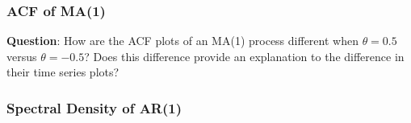 \documentclass[%
xcolor=pdftex]{beamer}
\begin{document}
\begin{frame}
\frametitle{ACF of MA(1)}

\textbf{Question}: How are the ACF plots of an MA(1) process different when $\theta=0.5$ versus $\theta=-0.5$? Does this difference provide an explanation to the difference in their time series plots?

\end{frame}

\begin{frame}
\frametitle{Spectral Density of AR(1)}



\end{frame}
\end{document}
